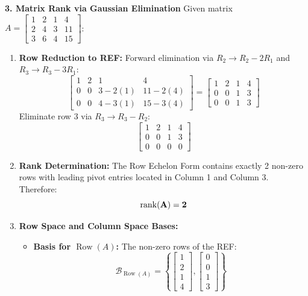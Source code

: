 \textbf{3. Matrix Rank via Gaussian Elimination}
Given matrix $A = \begin{bmatrix} 1 & 2 & 1 & 4 \\ 2 & 4 & 3 & 11 \\ 3 & 6 & 4 & 15 \end{bmatrix}$:
\begin{enumerate}
    \item \textbf{Row Reduction to REF:}
    Forward elimination via $R_2 \to R_2 - 2R_1$ and $R_3 \to R_3 - 3R_1$:
    \begin{equation*}
    \begin{bmatrix} 1 & 2 & 1 & 4 \\ 0 & 0 & 3 - 2(1) & 11 - 2(4) \\ 0 & 0 & 4 - 3(1) & 15 - 3(4) \end{bmatrix} = \begin{bmatrix} 1 & 2 & 1 & 4 \\ 0 & 0 & 1 & 3 \\ 0 & 0 & 1 & 3 \end{bmatrix}
    \end{equation*}
    Eliminate row 3 via $R_3 \to R_3 - R_2$:
    \begin{equation*}
    \begin{bmatrix} 1 & 2 & 1 & 4 \\ 0 & 0 & 1 & 3 \\ 0 & 0 & 0 & 0 \end{bmatrix}
    \end{equation*}
    \item \textbf{Rank Determination:}
    The Row Echelon Form contains exactly 2 non-zero rows with leading pivot entries located in Column 1 and Column 3. Therefore:
    \begin{equation*}
    \mathbf{\operatorname{rank}(A) = 2}
    \end{equation*}
    \item \textbf{Row Space and Column Space Bases:}
    \begin{itemize}
        \item \textbf{Basis for $\operatorname{Row}(A)$:} The non-zero rows of the REF:
        \begin{equation*}
        \mathcal{B}_{\operatorname{Row}(A)} = \left\{ \begin{bmatrix} 1 \\ 2 \\ 1 \\ 4 \end{bmatrix}, \begin{bmatrix} 0 \\ 0 \\ 1 \\ 3 \end{bmatrix} \right\}

\end{equation*}
\end{itemize}
\end{enumerate}
